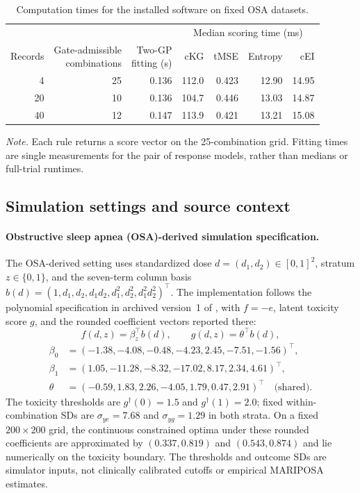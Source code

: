 \documentclass[11pt]{article}
\newcommand{\rev}[1]{{#1}}
\newcommand{\revisioncolor}{}
\begin{document}
\begin{table}[H]
\revisioncolor
\centering\footnotesize
\caption{Computation times for the installed software on fixed OSA datasets.}
\label{tab:fixed_data_runtime}
\begin{tabular}{@{}rrrrrrr@{}}
\toprule
& & & \multicolumn{4}{c}{Median scoring time (ms)} \\
\cmidrule(lr){4-7}
Records & \shortstack{Gate-admissible\\combinations} & \shortstack{Two-GP\\fitting (s)} & cKG & tMSE & Entropy & cEI\\
\midrule
4 & 25 & 0.136 & 112.0 & 0.423 & 12.90 & 14.95 \\
20 & 10 & 0.136 & 104.7 & 0.446 & 13.03 & 14.87 \\
40 & 12 & 0.147 & 113.9 & 0.421 & 13.21 & 15.08 \\
\bottomrule
\end{tabular}
\vspace{3pt}
\begin{minipage}{0.98\linewidth}\scriptsize\raggedright
\textit{Note.} Each rule returns a score vector on the 25-combination grid. Fitting times are single measurements for the pair of response models, rather than medians or full-trial runtimes.
\end{minipage}
\end{table}

\subsection{Simulation settings and source context}

\paragraph{Obstructive sleep apnea (OSA)-derived simulation specification.} The OSA-derived setting uses
standardized dose $d=(d_1,d_2)\in[0,1]^2$, stratum $z\in\{0,1\}$, and the \rev{seven-term column basis
$b(d)=(1,d_1,d_2,d_1d_2,d_1^2,d_2^2,d_1^2d_2^2)^\top$}. The implementation follows the polynomial specification in archived version~1 of \citet{willardobd}, with $f=-e$, latent toxicity score $g$, and the rounded coefficient vectors reported there:
\[
 f(d,z)=\beta_z^\top b(d),\qquad g(d,z)=\theta^\top b(d),
\]
\[
\begin{aligned}
\beta_0 &=(-1.38,-4.08,-0.48,-4.23,2.45,-7.51,-1.56)^{\rev{\top}},\\
\beta_1 &=(1.05,-11.28,-8.32,-17.02,8.17,2.34,4.61)^{\rev{\top}},\\
\theta &=(-0.59,1.83,2.26,-4.05,1.79,0.47,2.91)^{\rev{\top}}\quad\text{(shared)}.
\end{aligned}
\]
The toxicity thresholds are $g^\dagger(0)=1.5$ and $g^\dagger(1)=2.0$; fixed within-combination SDs are $\sigma_{ye}=7.68$ and $\sigma_{yg}=1.29$ in both strata. On a fixed $200\times200$ grid, the continuous constrained optima under these rounded coefficients are approximated by $(0.337,0.819)$ and $(0.543,0.874)$ and lie numerically on the toxicity boundary. The thresholds and outcome SDs are simulator inputs, not clinically calibrated cutoffs or empirical MARIPOSA estimates.
\end{document}
